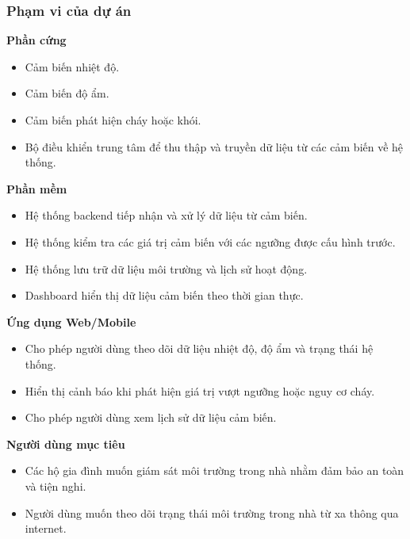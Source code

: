 \documentclass[a4paper,twoside]{article}
\begin{document}
\subsubsection{Phạm vi của dự án}

\textbf{Phần cứng}

\begin{itemize}

\item Cảm biến nhiệt độ.
\item Cảm biến độ ẩm.
\item Cảm biến phát hiện cháy hoặc khói.
\item Bộ điều khiển trung tâm để thu thập và truyền dữ liệu
từ các cảm biến về hệ thống.

\end{itemize}

\textbf{Phần mềm}

\begin{itemize}

\item Hệ thống backend tiếp nhận và xử lý dữ liệu từ cảm biến.

\item Hệ thống kiểm tra các giá trị cảm biến với các ngưỡng
được cấu hình trước.

\item Hệ thống lưu trữ dữ liệu môi trường và lịch sử hoạt động.

\item Dashboard hiển thị dữ liệu cảm biến theo thời gian thực.

\end{itemize}

\textbf{Ứng dụng Web/Mobile}

\begin{itemize}

\item Cho phép người dùng theo dõi dữ liệu nhiệt độ,
độ ẩm và trạng thái hệ thống.

\item Hiển thị cảnh báo khi phát hiện giá trị vượt ngưỡng
hoặc nguy cơ cháy.

\item Cho phép người dùng xem lịch sử dữ liệu cảm biến.

\end{itemize}

\textbf{Người dùng mục tiêu}

\begin{itemize}

\item Các hộ gia đình muốn giám sát môi trường trong nhà
nhằm đảm bảo an toàn và tiện nghi.

\item Người dùng muốn theo dõi trạng thái môi trường
trong nhà từ xa thông qua internet.

\end{itemize}
\end{document}
